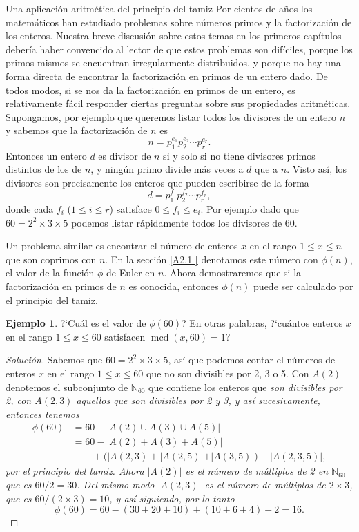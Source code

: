 \documentclass[11pt,spanish,makeidx]{amsbook}
\theoremstyle{definition}
\newtheorem{ejemplo}{Ejemplo}[section]
\theoremstyle{remark}
\newcommand \mcd{\operatorname{mcd}}
\begin{document}
\begin{section}{Una aplicación aritmética del principio del
tamiz}\label{Ap2.2} Por cientos de años los matemáticos han
estudiado problemas sobre números primos y la factorización de los
enteros. Nuestra breve discusión sobre estos temas en los primeros
capítulos debería haber convencido al lector de que estos
problemas son difíciles, porque los primos mismos se encuentran
irregularmente distribuidos, y porque no hay una forma directa de
encontrar la factorización en primos de un entero dado. De todos
modos, si se nos da la factorización en primos de un entero, es
relativamente fácil responder ciertas preguntas sobre sus
propiedades aritméticas. Supongamos, por ejemplo que queremos
listar todos los divisores de un entero $n$ y sabemos que la
factorización de $n$ es
$$
n=p_1^{e_1}p_2^{e_2}\cdots p_r^{e_r}.
$$
Entonces un entero $d$ es divisor de $n$ si y solo si no tiene
divisores primos distintos de los de $n$, y ningún primo divide
más veces a $d$ que a $n$. Visto así, los divisores son
precisamente los enteros que pueden escribirse de la forma
$$
d=p_1^{f_1}p_2^{f_2}\cdots p_r^{f_r},
$$
donde cada $f_i$ ($1\le i \le r$) satisface $0\le f_i \le e_i$.
Por ejemplo dado que $60= 2^2 \times 3 \times 5$ podemos listar
rápidamente todos los divisores de 60.

Un problema similar es encontrar el número de enteros $x$ en el
rango $1 \le x \le n$ que son coprimos con $n$. En la sección
\ref{A2.1 } denotamos este número con $\phi(n)$, el valor de la
función $\phi$ de Euler en $n$. Ahora demostraremos que si la
factorización en primos de $n$ es conocida, entonces $\phi(n)$
puede ser calculado por el principio del tamiz.

\begin{ejemplo}?`Cuál es el valor de $\phi(60)$? En otras
palabras, ?`cuántos enteros $x$ en el rango $1 \le x \le 60$
satisfacen $\mcd(x,60)=1$?
\end{ejemplo}
\begin{proof}[Solución] Sabemos que $60 =2^2 \times 3 \times 5$, así que
podemos contar el números de enteros $x$ en el rango $1 \le x \le
60$ que no son divisibles por 2, 3 o 5. Con $A(2)$ denotemos el
subconjunto de $\mathbb N_{60}$ que contiene los enteros que \it
son \rm divisibles por 2, con $A(2,3)$ aquellos que \it son \rm
divisibles por 2 y 3, y así sucesivamente, entonces tenemos
$$\begin{aligned}
\phi(60)&=60-|A(2) \cup A(3) \cup A(5)| \\
&= 60-|A(2) + A(3) + A(5)| \\
&\qquad+(|A(2,3) + |A(2,5)| + |A(3,5)|)-|A(2,3,5)|,
\end{aligned}
$$
por el principio del tamiz. Ahora $|A(2)|$ es el número de
múltiplos de 2 en $\mathbb N_{60}$ que es $60 /2 = 30$. Del mismo
modo $|A(2,3)|$ es el número de múltiplos de $2 \times 3$, que es
$60 /(2\times 3) = 10$, y así siguiendo, por lo tanto
$$
\phi(60) = 60 -(30+20+10)+(10+6+4)-2=16.
$$
\end{proof}


\end{section}
\end{document}
